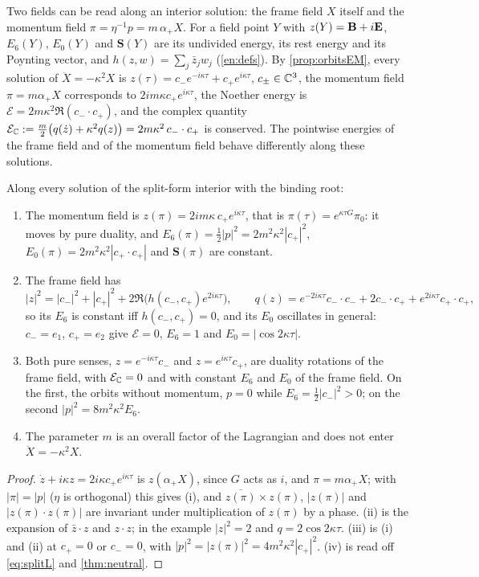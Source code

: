 Two fields can be read along an interior solution: the frame field $X$ itself and the momentum field $\pi=\eta^{-1}p=m\,\alpha_+X$.
For a field point $Y$ with $z(Y)=\mathbf B+i\mathbf E$, $E_6(Y)$, $E_0(Y)$ and $\mathbf S(Y)$ are its undivided energy, its rest energy and its
Poynting vector, and $h(z,w)=\sum_j\bar z_jw_j$ (\cref{en:defs}). By \cref{prop:orbitsEM}, every solution of $\ddot X=-\kappa^2X$ is $z(\tau)=c_-e^{-i\kappa\tau}+c_+e^{i\kappa\tau}$,
$c_\pm\in\mathbb{C}^3$, the momentum field $\pi=m\alpha_+X$ corresponds to $2im\kappa c_+e^{i\kappa\tau}$, the Noether energy is $\mathcal E=2m\kappa^2\Re(c_-\cdot c_+)$, and the
complex quantity $\mathcal E_{\mathbb{C}}:=\tfrac m2\bigl(q(\dot z)+\kappa^2q(z)\bigr)=2m\kappa^2\,c_-\cdot c_+$ is conserved. The pointwise energies of the frame
field and of the momentum field behave differently along these solutions.

\begin{proposition}
\label{en:interior}
Along every solution of the split-form interior with the binding root:
\begin{enumerate}[label=(\roman*),leftmargin=2.2em]
\item The momentum field is $z(\pi)=2im\kappa\,c_+e^{i\kappa\tau}$, that is $\pi(\tau)=e^{\kappa\tau G}\pi_0$: it moves by pure duality, and
$E_6(\pi)=\tfrac12|p|^2=2m^2\kappa^2|c_+|^2$, $E_0(\pi)=2m^2\kappa^2|c_+\cdot c_+|$ and $\mathbf S(\pi)$ are constant.
\item The frame field has
\[
|z|^2=|c_-|^2+|c_+|^2+2\Re\bigl(h(c_-,c_+)e^{2i\kappa\tau}\bigr),\qquad q(z)=e^{-2i\kappa\tau}c_-\cdot c_-+2c_-\cdot c_++e^{2i\kappa\tau}c_+\cdot c_+ ,
\]
so its $E_6$ is constant iff $h(c_-,c_+)=0$, and its $E_0$ oscillates in general: $c_-=e_1$, $c_+=e_2$ give $\mathcal E=0$, $E_6=1$ and
$E_0=|\cos2\kappa\tau|$.
\item Both pure senses, $z=e^{-i\kappa\tau}c_-$ and $z=e^{i\kappa\tau}c_+$, are duality rotations of the frame field, with $\mathcal E_{\mathbb{C}}=0$ and with
constant $E_6$ and $E_0$ of the frame field. On the first, the orbits without momentum, $p=0$ while $E_6=\tfrac12|c_-|^2>0$; on the second
$|p|^2=8m^2\kappa^2E_6$.
\item The parameter $m$ is an overall factor of the Lagrangian and does not enter $\ddot X=-\kappa^2X$.
\end{enumerate}
\end{proposition}

\begin{proof}
$\dot z+i\kappa z=2i\kappa c_+e^{i\kappa\tau}$ is $z(\alpha_+X)$, since $G$ acts as $i$, and $\pi=m\alpha_+X$; with $|\pi|=|p|$ ($\eta$ is orthogonal)
this gives (i), and $\overline{z(\pi)}\times z(\pi)$, $|z(\pi)|$ and $|z(\pi)\cdot z(\pi)|$ are invariant under multiplication of $z(\pi)$ by a phase. (ii) is the
expansion of $\bar z\cdot z$ and $z\cdot z$; in the example $|z|^2=2$ and $q=2\cos2\kappa\tau$. (iii) is (i) and (ii) at $c_+=0$ or $c_-=0$, with
$|p|^2=|z(\pi)|^2=4m^2\kappa^2|c_+|^2$. (iv) is read off \eqref{eq:splitL} and \cref{thm:neutral}.
\end{proof}

